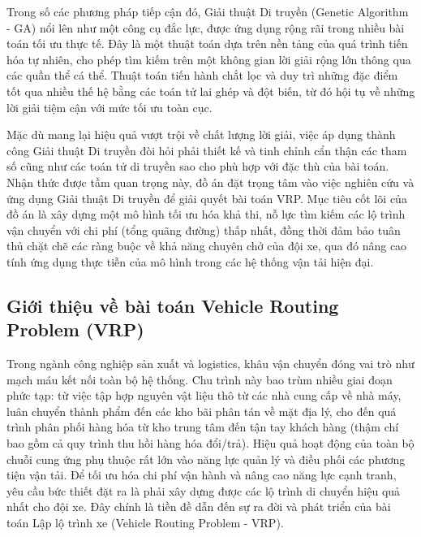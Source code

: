 \documentclass[12pt,a4paper]{article}
\numberwithin{figure}{subsection}
\begin{document}
Trong số các phương pháp tiếp cận đó, Giải thuật Di truyền (Genetic Algorithm - GA) nổi lên như một công cụ đắc lực, được ứng dụng rộng rãi trong nhiều bài toán tối ưu thực tế. Đây là một thuật toán dựa trên nền tảng của quá trình tiến hóa tự nhiên, cho phép tìm kiếm trên một không gian lời giải rộng lớn thông qua các quần thể cá thể. Thuật toán tiến hành chắt lọc và duy trì những đặc điểm tốt qua nhiều thế hệ bằng các toán tử lai ghép và đột biến, từ đó hội tụ về những lời giải tiệm cận với mức tối ưu toàn cục.

Mặc dù mang lại hiệu quả vượt trội về chất lượng lời giải, việc áp dụng thành công Giải thuật Di truyền đòi hỏi phải thiết kế và tinh chỉnh cẩn thận các tham số cũng như các toán tử di truyền sao cho phù hợp với đặc thù của bài toán. Nhận thức được tầm quan trọng này, đồ án đặt trọng tâm vào việc nghiên cứu và ứng dụng Giải thuật Di truyền để giải quyết bài toán VRP. Mục tiêu cốt lõi của đồ án là xây dựng một mô hình tối ưu hóa khả thi, nỗ lực tìm kiếm các lộ trình vận chuyển với chi phí (tổng quãng đường) thấp nhất, đồng thời đảm bảo tuân thủ chặt chẽ các ràng buộc về khả năng chuyên chở của đội xe, qua đó nâng cao tính ứng dụng thực tiễn của mô hình trong các hệ thống vận tải hiện đại.

\subsection{Giới thiệu về bài toán Vehicle Routing Problem (VRP)}
Trong ngành công nghiệp sản xuất và logistics, khâu vận chuyển đóng vai trò như mạch máu kết nối toàn bộ hệ thống. Chu trình này bao trùm nhiều giai đoạn phức tạp: từ việc tập hợp nguyên vật liệu thô từ các nhà cung cấp về nhà máy, luân chuyển thành phẩm đến các kho bãi phân tán về mặt địa lý, cho đến quá trình phân phối hàng hóa từ kho trung tâm đến tận tay khách hàng (thậm chí bao gồm cả quy trình thu hồi hàng hóa đổi/trả). Hiệu quả hoạt động của toàn bộ chuỗi cung ứng phụ thuộc rất lớn vào năng lực quản lý và điều phối các phương tiện vận tải. Để tối ưu hóa chi phí vận hành và nâng cao năng lực cạnh tranh, yêu cầu bức thiết đặt ra là phải xây dựng được các lộ trình di chuyển hiệu quả nhất cho đội xe. Đây chính là tiền đề dẫn đến sự ra đời và phát triển của bài toán Lập lộ trình xe (Vehicle Routing Problem - VRP).
\end{document}
